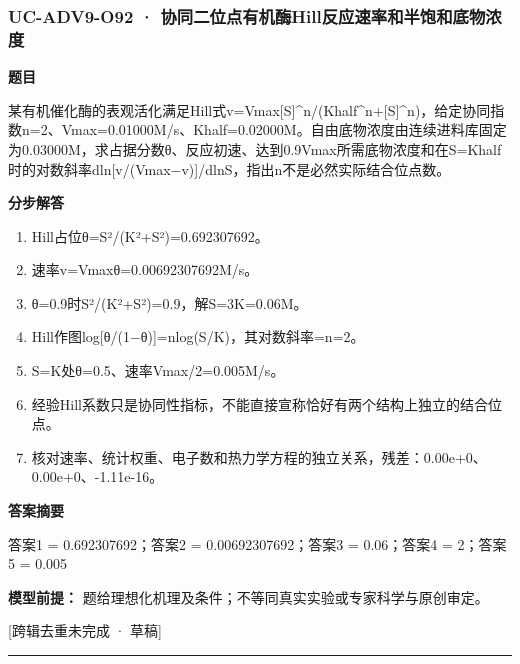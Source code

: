 \documentclass[UTF8,11pt,a4paper]{ctexart}
\begin{document}
\subsubsection*{UC-ADV9-O92 · 协同二位点有机酶Hill反应速率和半饱和底物浓度}
\noindent\textbf{题目}\par
某有机催化酶的表观活化满足Hill式v=Vmax[S]\textasciicircum{}n/(Khalf\textasciicircum{}n+[S]\textasciicircum{}n)，给定协同指数n=2、Vmax=0.01000M/s、Khalf=0.02000M。自由底物浓度由连续进料库固定为0.03000M，求占据分数θ、反应初速、达到0.9Vmax所需底物浓度和在S=Khalf时的对数斜率dln[v/(Vmax−v)]/dlnS，指出n不是必然实际结合位点数。\par
\medskip\noindent\textbf{分步解答}
\begin{enumerate}
\item Hill占位θ=S²/(K²+S²)=0.692307692。
\item 速率v=Vmaxθ=0.00692307692M/s。
\item θ=0.9时S²/(K²+S²)=0.9，解S=3K=0.06M。
\item Hill作图log[θ/(1−θ)]=nlog(S/K)，其对数斜率=n=2。
\item S=K处θ=0.5、速率Vmax/2=0.005M/s。
\item 经验Hill系数只是协同性指标，不能直接宣称恰好有两个结构上独立的结合位点。
\item 核对速率、统计权重、电子数和热力学方程的独立关系，残差：0.00e+0、0.00e+0、-1.11e-16。
\end{enumerate}
\noindent\textbf{答案摘要}\par
答案1 = 0.692307692；答案2 = 0.00692307692；答案3 = 0.06；答案4 = 2；答案5 = 0.005\par
\noindent\textbf{模型前提：}
题给理想化机理及条件；不等同真实实验或专家科学与原创审定。\par
\noindent\textcolor{red!65!black}{[跨辑去重未完成 · 草稿]} \par
\medskip\hrule\medskip
{}
\end{document}
